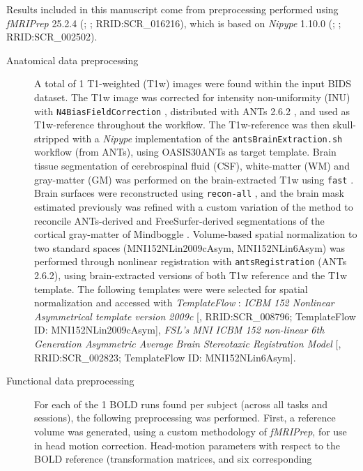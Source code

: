 \documentclass[
]{article}
\author{}
\date{}
\begin{document}
Results included in this manuscript come from preprocessing performed
using \emph{fMRIPrep} 25.2.4 (\citet{fmriprep1}; \citet{fmriprep2};
RRID:SCR\_016216), which is based on \emph{Nipype} 1.10.0
(\citet{nipype1}; \citet{nipype2}; RRID:SCR\_002502).

\begin{description}
\item[Anatomical data preprocessing]
A total of 1 T1-weighted (T1w) images were found within the input BIDS
dataset. The T1w image was corrected for intensity non-uniformity (INU)
with \texttt{N4BiasFieldCorrection} \citep{n4}, distributed with ANTs
2.6.2 \citep[RRID:SCR\_004757]{ants}, and used as T1w-reference
throughout the workflow. The T1w-reference was then skull-stripped with
a \emph{Nipype} implementation of the \texttt{antsBrainExtraction.sh}
workflow (from ANTs), using OASIS30ANTs as target template. Brain tissue
segmentation of cerebrospinal fluid (CSF), white-matter (WM) and
gray-matter (GM) was performed on the brain-extracted T1w using
\texttt{fast} \citep[FSL (version unknown),
RRID:SCR\_002823,][]{fsl_fast}. Brain surfaces were reconstructed using
\texttt{recon-all} \citep[FreeSurfer 7.3.2,
RRID:SCR\_001847,][]{fs_reconall}, and the brain mask estimated
previously was refined with a custom variation of the method to
reconcile ANTs-derived and FreeSurfer-derived segmentations of the
cortical gray-matter of Mindboggle
\citep[RRID:SCR\_002438,][]{mindboggle}. Volume-based spatial
normalization to two standard spaces (MNI152NLin2009cAsym,
MNI152NLin6Asym) was performed through nonlinear registration with
\texttt{antsRegistration} (ANTs 2.6.2), using brain-extracted versions
of both T1w reference and the T1w template. The following templates were
were selected for spatial normalization and accessed with
\emph{TemplateFlow} \citep[25.0.4,][]{templateflow}: \emph{ICBM 152
Nonlinear Asymmetrical template version 2009c}
{[}\citet{mni152nlin2009casym}, RRID:SCR\_008796; TemplateFlow ID:
MNI152NLin2009cAsym{]}, \emph{FSL's MNI ICBM 152 non-linear 6th
Generation Asymmetric Average Brain Stereotaxic Registration Model}
{[}\citet{mni152nlin6asym}, RRID:SCR\_002823; TemplateFlow ID:
MNI152NLin6Asym{]}.
\item[Functional data preprocessing]
For each of the 1 BOLD runs found per subject (across all tasks and
sessions), the following preprocessing was performed. First, a reference
volume was generated, using a custom methodology of \emph{fMRIPrep}, for
use in head motion correction. Head-motion parameters with respect to
the BOLD reference (transformation matrices, and six corresponding

\end{description}
\end{document}
